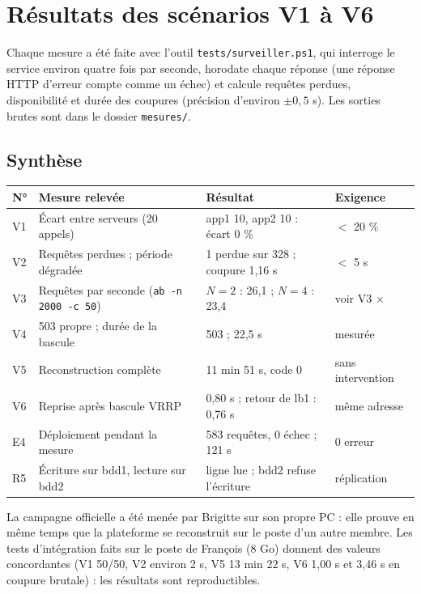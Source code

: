 \documentclass[11pt,a4paper,oneside]{report}
\newcommand{\cmd}[1]{\texttt{#1}}
\begin{document}
	\chapter{Résultats des scénarios V1 à V6}
	
	Chaque mesure a été faite avec l'outil \cmd{tests/surveiller.ps1}, qui interroge le service
	environ quatre fois par seconde, horodate chaque réponse (une réponse HTTP d'erreur compte comme
	un échec) et calcule requêtes perdues, disponibilité et durée des coupures (précision d'environ
	$\pm 0{,}5$ s). Les sorties brutes sont dans le dossier \cmd{mesures/}.
	
	\section{Synthèse}
	
	\begin{tabularx}{\textwidth}{@{}l X l l@{}}
		\toprule
		\textbf{N°} & \textbf{Mesure relevée} & \textbf{Résultat} & \textbf{Exigence} \\
		\midrule
		V1 & Écart entre serveurs (20 appels) & app1 10, app2 10 : écart 0 \% & $<$ 20 \% \quad\checkmark \\
		V2 & Requêtes perdues ; période dégradée & 1 perdue sur 328 ; coupure 1,16 s & $<$ 5 s \quad\checkmark \\
		V3 & Requêtes par seconde (\cmd{ab -n 2000 -c 50}) & $N=2$ : 26,1 ; $N=4$ : 23,4 & voir V3 \quad $\times$ \\
		V4 & 503 propre ; durée de la bascule & 503 ; 22,5 s & mesurée \quad\checkmark \\
		V5 & Reconstruction complète & 11 min 51 s, code 0 & sans intervention \quad\checkmark \\
		V6 & Reprise après bascule VRRP & 0,80 s ; retour de lb1 : 0,76 s & même adresse \quad\checkmark \\
		E4 & Déploiement pendant la mesure & 583 requêtes, 0 échec ; 121 s & 0 erreur \quad \checkmark \\
		R5 & Écriture sur bdd1, lecture sur bdd2 & ligne lue ; bdd2 refuse l'écriture & réplication \quad\checkmark \\
		\bottomrule
	\end{tabularx}
	
	
	La campagne officielle a été menée par Brigitte sur son propre PC : elle prouve en même temps
	que la plateforme se reconstruit sur le poste d'un autre membre. Les tests d'intégration faits
	sur le poste de François (8 Go) donnent des valeurs concordantes (V1 50/50, V2 environ 2 s,
	V5 13 min 22 s, V6 1,00 s et 3,46 s en coupure brutale) : les résultats sont reproductibles.
	
\end{document}
